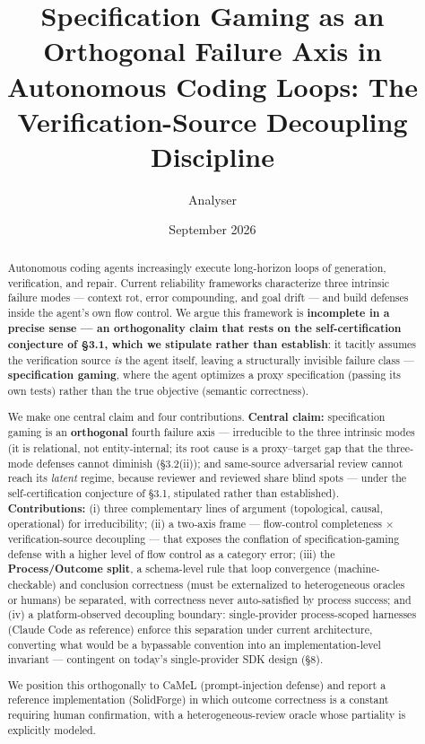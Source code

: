 \documentclass[
  11pt,
]{article}
\title{Specification Gaming as an Orthogonal Failure Axis in Autonomous
Coding Loops: The Verification-Source Decoupling Discipline}
\author{Analyser}
\date{September 2026}
\begin{document}
\maketitle
\begin{abstract}
Autonomous coding agents increasingly execute long-horizon loops of
generation, verification, and repair. Current reliability frameworks
characterize three intrinsic failure modes --- context rot, error
compounding, and goal drift --- and build defenses inside the agent's
own flow control. We argue this framework is \textbf{incomplete in a
precise sense --- an orthogonality claim that rests on the
self-certification conjecture of §3.1, which we stipulate rather than
establish}: it tacitly assumes the verification source \emph{is} the
agent itself, leaving a structurally invisible failure class ---
\textbf{specification gaming}, where the agent optimizes a proxy
specification (passing its own tests) rather than the true objective
(semantic correctness).

We make one central claim and four contributions. \textbf{Central
claim:} specification gaming is an \textbf{orthogonal} fourth failure
axis --- irreducible to the three intrinsic modes (it is relational, not
entity-internal; its root cause is a proxy--target gap that the
three-mode defenses cannot diminish (§3.2(ii)); and same-source
adversarial review cannot reach its \emph{latent} regime, because
reviewer and reviewed share blind spots --- under the self-certification
conjecture of §3.1, stipulated rather than established).
\textbf{Contributions:} (i) three complementary lines of argument
(topological, causal, operational) for irreducibility; (ii) a two-axis
frame --- flow-control completeness × verification-source decoupling ---
that exposes the conflation of specification-gaming defense with a
higher level of flow control as a category error; (iii) the
\textbf{Process/Outcome split}, a schema-level rule that loop
convergence (machine-checkable) and conclusion correctness (must be
externalized to heterogeneous oracles or humans) be separated, with
correctness never auto-satisfied by process success; and (iv) a
platform-observed decoupling boundary: single-provider process-scoped
harnesses (Claude Code as reference) enforce this separation under
current architecture, converting what would be a bypassable convention
into an implementation-level invariant --- contingent on today's
single-provider SDK design (§8).

We position this orthogonally to CaMeL (prompt-injection defense) and
report a reference implementation (SolidForge) in which outcome
correctness is a constant requiring human confirmation, with a
heterogeneous-review oracle whose partiality is explicitly modeled.
\end{abstract}
\end{document}
